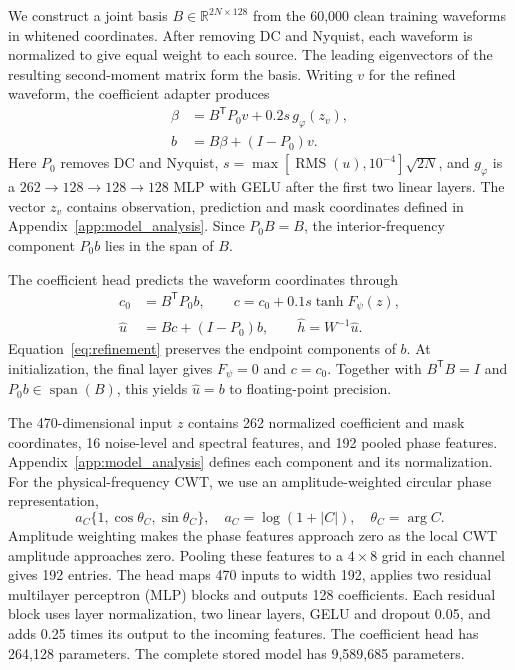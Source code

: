 \documentclass[10pt,prd,aps,a4paper,twocolumn,superscriptaddress,nofootinbib,floatfix]{revtex4-2}
\begin{document}
We construct a joint basis $B\in\mathbb R^{2N\times128}$ from the 60,000 clean training waveforms in whitened coordinates. After removing DC and Nyquist, each waveform is normalized to give equal weight to each source. The leading eigenvectors of the resulting second-moment matrix form the basis. Writing $v$ for the refined waveform, the coefficient adapter produces
\begin{align}
\beta&=B^{\mathsf T}P_0v+0.2s\,g_\varphi(z_v),\nonumber\\
b&=B\beta+(I-P_0)v.\label{eq:basis_adapter}
\end{align}
Here $P_0$ removes DC and Nyquist, $s=\max[\operatorname{RMS}(u),10^{-4}]\sqrt{2N}$, and $g_\varphi$ is a $262\to128\to128\to128$ MLP with GELU after the first two linear layers. The vector $z_v$ contains observation, prediction and mask coordinates defined in Appendix~\ref{app:model_analysis}. Since $P_0B=B$, the interior-frequency component $P_0b$ lies in the span of $B$.

The coefficient head predicts the waveform coordinates through
\begin{align}
c_0&=B^{\mathsf T}P_0b,\qquad
c=c_0+0.1s\tanh F_\psi(z),\label{eq:refinement}\\
\widehat u&=Bc+(I-P_0)b,\qquad
\widehat h=W^{-1}\widehat u.\nonumber
\end{align}
Equation~\eqref{eq:refinement} preserves the endpoint components of $b$. At initialization, the final layer gives $F_\psi=0$ and $c=c_0$. Together with $B^{\mathsf T}B=I$ and $P_0b\in\operatorname{span}(B)$, this yields $\widehat u=b$ to floating-point precision.

The 470-dimensional input $z$ contains 262 normalized coefficient and mask coordinates, 16 noise-level and spectral features, and 192 pooled phase features. Appendix~\ref{app:model_analysis} defines each component and its normalization. For the physical-frequency CWT, we use an amplitude-weighted circular phase representation,
\begin{equation}
a_C\{1,\cos\theta_C,\sin\theta_C\},\quad
a_C=\log(1+|C|),\quad\theta_C=\arg C.\label{eq:continuous_phase}
\end{equation}
Amplitude weighting makes the phase features approach zero as the local CWT amplitude approaches zero. Pooling these features to a $4\times8$ grid in each channel gives 192 entries. The head maps 470 inputs to width 192, applies two residual multilayer perceptron (MLP) blocks and outputs 128 coefficients. Each residual block uses layer normalization, two linear layers, GELU and dropout 0.05, and adds 0.25 times its output to the incoming features. The coefficient head has 264,128 parameters. The complete stored model has 9,589,685 parameters.
\end{document}
